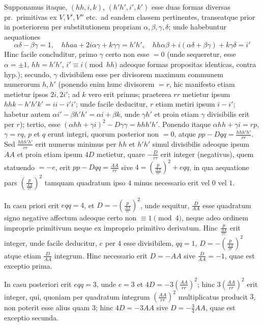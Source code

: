 \documentclass[12pt,a4paper]{article}
\theoremstyle{plain}
\theoremstyle{definition}
\theoremstyle{remark}
\theoremstyle{problemstyle}
\begin{document}
Supponamus itaque, $(hh, i, k)$, $(h'h', i', k')$ esse duas formas diversas pr.\ primitivas ex $V, V', V''$ etc.\ ad eandem classem pertinentes, transeatque prior in posteriorem per substitutionem propriam $\alpha, \beta, \gamma, \delta$; unde habebuntur aequationes
\[
\alpha\delta - \beta\gamma = 1, \quad hhaa + 2i\alpha\gamma + k\gamma\gamma = h'h', \quad hh\alpha\beta + i(\alpha\delta + \beta\gamma) + k\gamma\delta = i'
\]
Hinc facile concluditur, primo $\gamma$ certo non esse $= 0$ (unde sequeretur, esse $\alpha = \pm 1$, $hh = h'h'$, $i' \equiv i \pmod{hh}$ adeoque formas propositas identicas, contra hyp.); secundo, $\gamma$ divisibilem esse per divisorem maximum communem numerorum $h, h'$ (ponendo enim hunc divisorem $= r$, hic manifesto etiam metietur ipsos $2i, 2i'$; ad $k$ vero erit primus; praeterea $rr$ metietur ipsum $hhk - h'h'k' = ii - i'i'$; unde facile deducitur, $r$ etiam metiri ipsum $i - i'$; habetur autem $\alpha i' - \beta h'h' = \alpha i + \beta k$, unde $\gamma h'$ et proin etiam $\gamma$ divisibilis erit per $r$); tertio, esse $(\alpha hh + \gamma i)^2 - D\gamma\gamma = hhh'h'$. Ponendo itaque $\alpha hh + \gamma i = rp$, $\gamma = rq$, $p$ et $q$ erunt integri, quorum posterior non $= 0$, atque $pp - Dqq = \frac{hhh'h'}{rr}$. Sed $\frac{hhh'h'}{rr}$ erit numerus minimus per $hh$ et $h'h'$ simul divisibilis adeoque ipsum $AA$ et proin etiam ipsum $4D$ metietur, quare $-\frac{D}{rr}$ erit integer (negativus), quem statuendo $= -e$, erit $pp - Dqq = \frac{AA}{rr}$ sive $4 = (\frac{p}{\frac{AA}{rr}})^2 + eqq$, in qua aequatione pars $(\frac{p}{\frac{AA}{rr}})^2$ tamquam quadratum ipso $4$ minus necessario erit vel $0$ vel $1$.

In casu priori erit $eqq = 4$, et $D = -(\frac{p}{\frac{AA}{rr}})^2$, unde sequitur, $\frac{D}{AA}$ esse quadratum signo negative affectum adeoque certo non $\equiv 1 \pmod{4}$, neque adeo ordinem improprie primitivum neque ex improprio primitivo derivatum. Hinc $\frac{p}{\frac{AA}{rr}}$ erit integer, unde facile deducitur, $e$ per $4$ esse divisibilem, $qq = 1$, $D = -(\frac{p}{\frac{AA}{rr}})^2$ atque etiam $\frac{D}{AA}$ integrum. Hinc necessario erit $D = -AA$ sive $\frac{D}{AA} = -1$, quae est exceptio prima.

In casu posteriori erit $eqq = 3$, unde $e = 3$ et $4D = -3(\frac{AA}{rr})^2$; hinc $3(\frac{AA}{rr})^2$ erit integer, qui, quoniam per quadratum integrum $(\frac{AA}{rr})^2$ multiplicatus producit $3$, non poterit esse alius quam $3$; hinc $4D = -3AA$ sive $D = -\tfrac{3}{4}AA$, quae est exceptio secunda.
\end{document}
